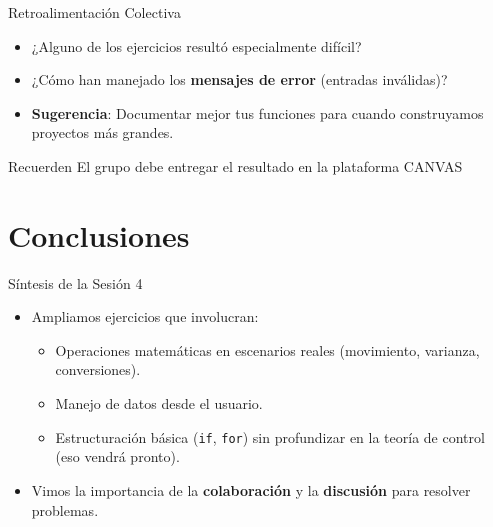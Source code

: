 \documentclass[10pt]{beamer}
\begin{document}
\begin{frame}{Retroalimentación Colectiva}
  \begin{itemize}
    \item ¿Alguno de los ejercicios resultó especialmente difícil?
    \item ¿Cómo han manejado los \textbf{mensajes de error} (entradas inválidas)?
    \item \textbf{Sugerencia}: Documentar mejor tus funciones para cuando construyamos proyectos más grandes.
  \end{itemize}
  \begin{block}{Recuerden}
    El grupo debe entregar el resultado en la plataforma CANVAS
  \end{block}
\end{frame}

\section{Conclusiones}

\begin{frame}{Síntesis de la Sesión 4}
  \begin{itemize}
    \item Ampliamos ejercicios que involucran:
      \begin{itemize}
        \item Operaciones matemáticas en escenarios reales (movimiento, varianza, conversiones).
        \item Manejo de datos desde el usuario.
        \item Estructuración básica (\texttt{if}, \texttt{for}) sin profundizar en la teoría de control (eso vendrá pronto).
      \end{itemize}
    \item Vimos la importancia de la \textbf{colaboración} y la \textbf{discusión} para resolver problemas.
  \end{itemize}
\end{frame}
\end{document}
